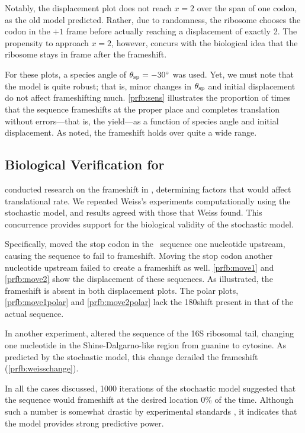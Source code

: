 \documentclass[12pt, draft]{article}
\numberwithin{equation}{section}
\begin{document}
Notably, the displacement plot does not reach $x=2$ over the span of one codon, as the old model predicted.
Rather, due to randomness, the ribosome chooses the codon in the $+1$ frame before actually reaching a displacement of exactly 2.
The propensity to approach $x=2$, however, concurs with the biological idea that the ribosome stays in frame after the frameshift.

For these plots, a species angle of $\theta_{\rm{sp}} =-30^\circ$ was used.
Yet, we must note that the model is quite robust; that is, minor changes
in $\theta_{\rm{sp}}$ and initial displacement do not affect frameshifting much.
\autoref{prfb:sens} illustrates the proportion of times that the sequence
frameshifts at the proper place and completes translation without errors---that is, the yield---as
a function of species angle and initial displacement.  As noted,
the frameshift holds over quite a wide range.

\subsection{Biological Verification for \prfB}

\citet{weiss87,weiss88} conducted research on the
frameshift in \prfB, determining factors that would affect
translational rate.  We repeated Weiss's experiments computationally
using the stochastic model, and results agreed with those that Weiss found.
This concurrence provides support for the biological validity of
the stochastic model.


Specifically, \citeauthor{weiss87} moved the stop codon in the
\prfB\ sequence one nucleotide upstream, causing the sequence to fail to
frameshift. Moving the stop codon another nucleotide upstream failed
to create a frameshift as well. \autoref{prfb:move1} and \autoref{prfb:move2}
show the displacement of these sequences.  As illustrated,
the frameshift is absent in both displacement plots.  The polar
plots, \autoref{prfb:move1polar} and \autoref{prfb:move2polar}
lack the 180\degree shift present in that of the actual sequence.

In another experiment, \citeauthor{weiss88} altered the sequence of the
16S ribosomal tail, changing one nucleotide in the Shine-Dalgarno-like region
from guanine to cytosine.  As predicted by the stochastic model, this
change derailed the frameshift (\autoref{prfb:weisschange}).

In all the cases discussed, 1000 iterations of the stochastic model
suggested that the sequence would frameshift at the desired location 0\%
of the time.  Although such a number is somewhat drastic by experimental
standards \cite{weiss87,weiss88}, it indicates that the model provides
strong predictive power.
\end{document}
